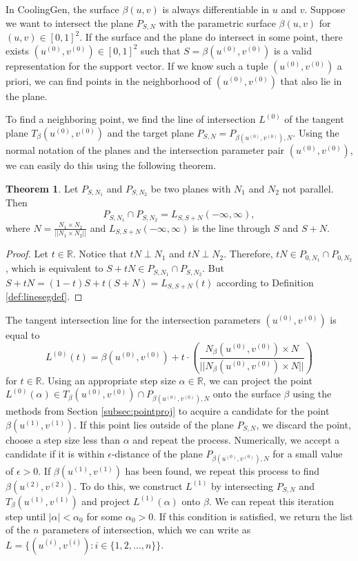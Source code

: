 \documentclass[a4paper, 11pt]{report}
\theoremstyle{definition}
\newtheorem{theorem}[definition]{Theorem}
\begin{document}
	In CoolingGen, the surface $\beta(u,v)$ is always differentiable in $u$ and $v$. Suppose we want to intersect the plane $P_{S,N}$ with the parametric surface $\beta(u,v)$ for $(u,v) \in [0,1]^2$. If the surface and the plane do intersect in some point, there exists $(u^{(0)}, v^{(0)}) \in [0,1]^2$ such that $S = \beta(u^{(0)}, v^{(0)})$ is a valid representation for the support vector. If we know such a tuple $(u^{(0)}, v^{(0)})$ a priori, we can find points in the neighborhood of $(u^{(0)}, v^{(0)})$ that also lie in the plane.

	To find a neighboring point, we find the line of intersection $L^{(0)}$ of the tangent plane $T_{\beta}(u^{(0)}, v^{(0)})$ and the target plane $P_{S,N} = P_{\beta(u^{(0)}, v^{(0)}), N}$. Using the normal notation of the planes and the intersection parameter pair $(u^{(0)}, v^{(0)})$, we can easily do this using the following theorem.

	\begin{theorem}
		Let $P_{S, N_1}$ and $P_{S, N_2}$ be two planes with $N_1$ and $N_2$ not parallel. Then
			$$ P_{S, N_1} \cap P_{S, N_2} = L_{S, S+N}(-\infty, \infty), $$
		where $N = \frac{N_1 \times N_2}{|| N_1 \times N_2 ||}$ and $L_{S,S+N}(-\infty, \infty)$ is the line through $S$ and $S+N$. 
	\end{theorem}
	\begin{proof}
		Let $t \in \mathbb{R}$. Notice that $tN \perp N_1$ and $tN \perp N_2$. Therefore, $tN \in P_{0, N_1} \cap P_{0, N_2}$, which is equivalent to $S+tN \in P_{S, N_1} \cap P_{S, N_2}$. But $S+tN = (1-t)S + t(S+N) = L_{S,S+N}(t)$ according to Definition \ref{def:linesegdef}.
	\end{proof}

	The tangent intersection line for the intersection parameters $(u^{(0)}, v^{(0)})$ is equal to
		$$ L^{(0)}(t) = \beta(u^{(0)}, v^{(0)}) + t \cdot \left(\frac{N_{\beta}(u^{(0)}, v^{(0)}) \times N}{||N_{\beta}(u^{(0)}, v^{(0)}) \times N||}\right)$$
	for $t \in \mathbb{R}$. Using an appropriate step size $\alpha \in \mathbb{R}$, we can project the point $L^{(0)}(\alpha) \in T_{\beta}(u^{(0)}, v^{(0)}) \cap P_{\beta(u^{(0)}, v^{(0)}), N}$ onto the surface $\beta$ using the methods from Section \ref{subsec:pointproj} to acquire a candidate for the point $\beta(u^{(1)}, v^{(1)})$. If this point lies outside of the plane $P_{S,N}$, we discard the point, choose a step size less than $\alpha$ and repeat the process. Numerically, we accept a candidate if it is within $\epsilon$-distance of the plane $P_{\beta(u^{(0)}, v^{(0)}), N}$ for a small value of $\epsilon > 0$. If $\beta(u^{(1)}, v^{(1)})$ has been found, we repeat this process to find $\beta(u^{(2)}, v^{(2)})$. To do this, we construct $L^{(1)}$ by intersecting $P_{S,N}$ and $T_{\beta}(u^{(1)}, v^{(1)})$ and project $L^{(1)}(\alpha)$ onto $\beta$. We can repeat this iteration step until $|\alpha| < \alpha_0$ for some $\alpha_0 > 0$. If this condition is satisfied, we return the list of the $n$ parameters of intersection, which we can write as $L = \{(u^{(i)}, v^{(i)}): i \in \{1,2,\ldots,n\}\}$.
\end{document}

